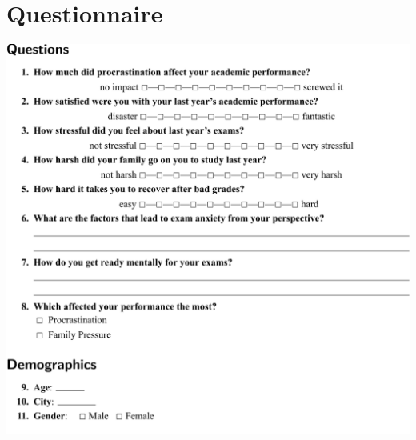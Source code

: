 \documentclass[12pt]{report}
\begin{document}
\printbibliography[heading=bibintoc, title={References}]

\appendix
\chapter{Questionnaire}
% 

\begin{center}
    \includegraphics[width=1\linewidth]{questionnaire.pdf}
\end{center}

\end{document}
